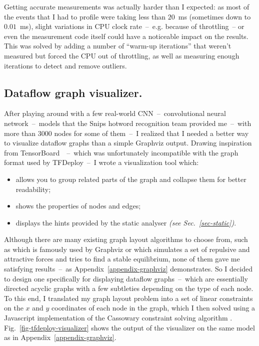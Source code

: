 \documentclass[11pt]{article}
\begin{document}
Getting accurate measurements was actually harder than I expected: as most of the events that I had to profile were taking less than $20$~ms (sometimes down to $0.01$~ms), slight variations in CPU clock rate~--~e.g. because of throttling~-- or even the measurement code itself could have a noticeable impact on the results. This was solved by adding a number of ``warm-up iterations'' that weren't measured but forced the CPU out of throttling, as well as measuring enough iterations to detect and remove outliers.

\subsection{Dataflow graph visualizer.}
After playing around with a few real-world CNN~--~convolutional neural network~--~models that the Snips hotword recognition team provided me~--~with more than $3000$ nodes for some of them~--~I realized that I needed a better way to visualize dataflow graphs than a simple Graphviz output. Drawing inspiration from TensorBoard~\cite{tensorboard}~--~which was unfortunately incompatible with the graph format used by TFDeploy~--~I wrote a visualization tool \cite{visualizer} which:
\begin{itemize}[noitemsep]
    \item allows you to group related parts of the graph and collapse them for better readability;
    \item shows the properties of nodes and edges;
    \item displays the hints provided by the static analyser \textit{(see Sec.~\ref{sec-static})}.
\end{itemize}

Although there are many existing graph layout algorithms to choose from, such as \cite{dag-algorithm} which is famously used by Graphviz or \cite{force-algorithm} which simulates a set of repulsive and attractive forces and tries to find a stable equilibrium, none of them gave me satisfying results~--~as Appendix~\ref{appendix-graphviz} demonstrates. So I decided to design one specifically for displaying dataflow graphs~--~which are essentially directed acyclic graphs with a few subtleties depending on the type of each node. To this end, I translated my graph layout problem into a set of linear constraints on the $x$ and $y$ coordinates of each node in the graph, which I then solved using a Javascript implementation \cite{kiwi-js} of the Cassowary constraint solving algorithm \cite{cassowary}. Fig.~\ref{fig-tfdeploy-visualizer} shows the output of the visualizer on the same model as in Appendix~\ref{appendix-graphviz}.
\end{document}
